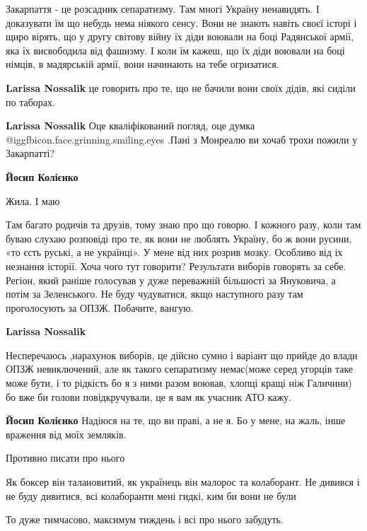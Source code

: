\begin{itemize}
Закарпаття - це розсадник сепаратизму. Там многі Україну ненавидять. І
доказувати їм що небудь нема ніякого сенсу. Вони не знають навіть своєї історі
і щиро вірять, що у другу світову війну їх діди воювали на боці Радянської
армії, яка їх висвободила від фашизму. І коли їм кажеш, що їх діди воювали на
боці німців, в мадярській армії, вони начинають на тебе огризатися.

\begin{itemize} %
\textbf{Larissa Nossalik} це говорить про те, що не бачили вони своїх дідів, які сиділи по таборах.

\textbf{Larissa Nossalik} Оце кваліфікований погляд, оце думка @igg{fbicon.face.grinning.smiling.eyes} .Пані з Монреалю ви хочаб трохи пожили у Закарпатті?

\textbf{Йосип Колієнко} 

Жила. І маю

Там багато родичів та друзів, тому знаю про що говорю. І кожного разу, коли там
буваю слухаю розповіді про те, як вони не люблять Україну, бо ж вони русини,
«то єсть руські, а не українці». У мене від них розрив мозку. Особливо від іх
незнання історії. Хоча чого тут говорити? Результати виборів говорять за себе.
Регіон, який раніше голосував у дуже переважній більшості за Януковича, а потім
за Зеленського. Не буду чудуватися, якщо наступного разу там проголосують за
ОПЗЖ. Побачите, вангую.

\textbf{Larissa Nossalik} 

Несперечаюсь ,нарахунок виборів, це дійсно сумно і варіант що прийде до влади
ОПЗЖ невиключений, але як такого сепаратизму немає(може серед угорців таке може
бути, і то рідкість бо я з ними разом воював, хлопці кращі ніж Галичини) бо вже
би голови повідкручували, це я вам як учасник АТО кажу.

\textbf{Йосип Колієнко} Надіюся на те, що ви праві, а не я. Бо у мене, на жаль, інше враження від моїх земляків.

\end{itemize} %

Противно писати про нього

Як боксер він талановитий, як українець він малорос та колаборант. Не дивився і не буду дивитися, всі колаборанти мені гидкі, ким би вони не були

То дуже тимчасово, максимум тиждень і всі про нього забудуть.


\end{itemize}
